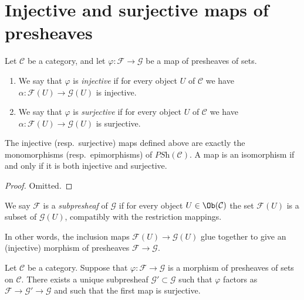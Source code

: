 \section{Injective and surjective maps of presheaves}
\label{section-injective-surjective}

\begin{definition}
\label{definition-presheaves-injective-surjective}
Let $\mathcal{C}$ be a category, and let $\varphi : \mathcal{F}
\to \mathcal{G}$ be a map of presheaves of sets.
\begin{enumerate}
\item We say that $\varphi$ is {\it injective} if for every object
$U$ of $\mathcal{C}$ we have $\alpha : \mathcal{F}(U)
\to \mathcal{G}(U)$ is injective.
\item We say that $\varphi$ is {\it surjective} if for every object
$U$ of $\mathcal{C}$ we have $\alpha : \mathcal{F}(U)
\to \mathcal{G}(U)$ is surjective.
\end{enumerate}
\end{definition}

\begin{lemma}
\label{lemma-mono-epi}
The injective (resp.\ surjective) maps defined above
are exactly the monomorphisms (resp.\ epimorphisms) of
$\textit{PSh}(\mathcal{C})$. A map is an isomorphism
if and only if it is both injective and surjective.
\end{lemma}

\begin{proof}
Omitted.
\end{proof}

\begin{definition}
\label{definition-sub-presheaf}
We say $\mathcal{F}$ is a {\it subpresheaf} of $\mathcal{G}$
if for every object $U \in \Ob(\mathcal{C})$ the set
$\mathcal{F}(U)$ is a subset of $\mathcal{G}(U)$, compatibly
with the restriction mappings.
\end{definition}

\noindent
In other words, the inclusion
maps $\mathcal{F}(U) \to \mathcal{G}(U)$
glue together to give an (injective) morphism of
presheaves $\mathcal{F} \to \mathcal{G}$.

\begin{lemma}
\label{lemma-image}
Let $\mathcal{C}$ be a category.
Suppose that $\varphi : \mathcal{F} \to \mathcal{G}$ is a
morphism of presheaves of sets on $\mathcal{C}$.
There exists a unique subpresheaf $\mathcal{G}' \subset \mathcal{G}$
such that $\varphi$ factors as
$\mathcal{F} \to \mathcal{G}' \to \mathcal{G}$
and such that the first map is surjective.
\end{lemma}

